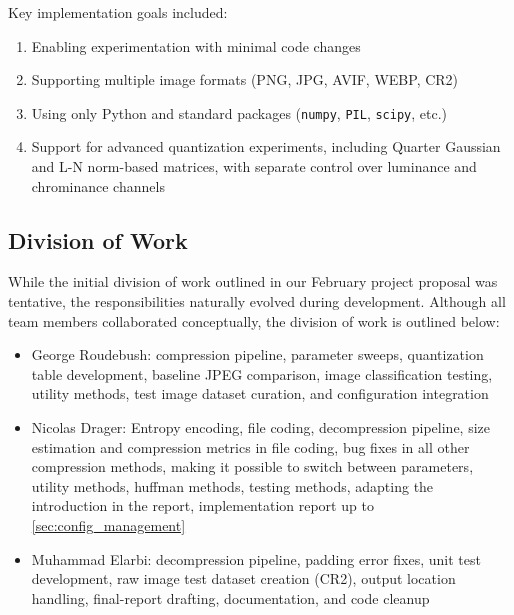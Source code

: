 Key implementation goals included:
\begin{enumerate}
    \item Enabling experimentation with minimal code changes
    \item Supporting multiple image formats (PNG, JPG, AVIF, WEBP, CR2)
    \item Using only Python and standard packages (\texttt{numpy}, \texttt{PIL}, \texttt{scipy}, etc.)
    \item Support for advanced quantization experiments, including Quarter Gaussian and L-N norm-based matrices, with separate control over luminance and chrominance channels
\end{enumerate}

\subsection{Division of Work}
\label{sec:division-of-work}

While the initial division of work outlined in our February project proposal was tentative, the responsibilities naturally evolved during development. Although all team members collaborated conceptually, the division of work is outlined below:
\begin{itemize}
  \item George Roudebush: compression pipeline, parameter sweeps, quantization table development, baseline JPEG comparison, image classification testing, utility methods, test image dataset curation, and configuration integration
  \item Nicolas Drager: Entropy encoding, file coding, decompression pipeline, size estimation and compression metrics in file coding, bug fixes in all other compression methods, making it possible to switch between parameters, utility methods, huffman methods, testing methods, adapting the introduction in the report, implementation report up to \ref{sec:config_management}
  \item Muhammad Elarbi: decompression pipeline, padding error fixes, unit test development, raw image test dataset creation (CR2), output location handling, final-report drafting, documentation, and code cleanup
\end{itemize}